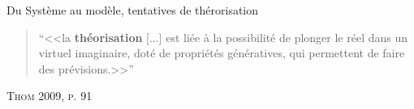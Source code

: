 \documentclass[newPxFont]{beamer}
\begin{document}
\begin{frame}[c]{Du Système au modèle, tentatives de thérorisation}
\vspace{-1em}
\begin{quote}
  \enquote{<<la \textbf{théorisation} [...] est liée à la possibilité de plonger le réel dans un virtuel imaginaire, doté de propriétés génératives, qui permettent de faire des prévisions.>>}
\end{quote}
\hspace*{\fill}\textsc{Thom 2009, p. 91}
\vspace{-0.5em}
\begin{figure}
 	\centering
 		\hspace{0.2em} %
    \hspace{0.2em} %
 		\hspace{0.2em} %
\end{figure}
\end{frame}
\end{document}
